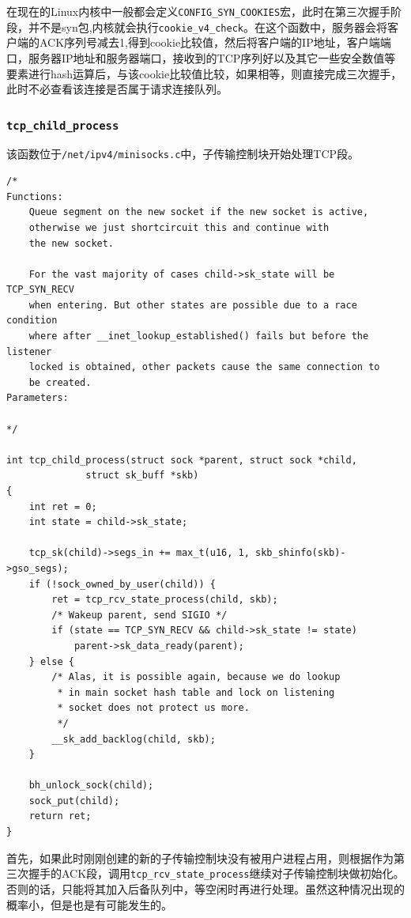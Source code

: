                     在现在的Linux内核中一般都会定义\texttt{CONFIG_SYN_COOKIES}宏，此时在第三次握手阶段，并不是syn包,内核就会执行\texttt{cookie_v4_check}。在这个函数中，服务器会将客户端的ACK序列号减去1,得到cookie比较值，然后将客户端的IP地址，客户端端口，服务器IP地址和服务器端口，接收到的TCP序列好以及其它一些安全数值等要素进行hash运算后，与该cookie比较值比较，如果相等，则直接完成三次握手，此时不必查看该连接是否属于请求连接队列。

                \subsubsection{\texttt{tcp_child_process}}

                    该函数位于\texttt{/net/ipv4/minisocks.c}中，子传输控制块开始处理TCP段。

\begin{verbatim}
/*
Functions:
    Queue segment on the new socket if the new socket is active,
    otherwise we just shortcircuit this and continue with
    the new socket.

    For the vast majority of cases child->sk_state will be TCP_SYN_RECV
    when entering. But other states are possible due to a race condition
    where after __inet_lookup_established() fails but before the listener
    locked is obtained, other packets cause the same connection to
    be created.
Parameters:
    
*/

int tcp_child_process(struct sock *parent, struct sock *child,
              struct sk_buff *skb)
{
    int ret = 0;
    int state = child->sk_state;

    tcp_sk(child)->segs_in += max_t(u16, 1, skb_shinfo(skb)->gso_segs);
    if (!sock_owned_by_user(child)) {
        ret = tcp_rcv_state_process(child, skb);
        /* Wakeup parent, send SIGIO */
        if (state == TCP_SYN_RECV && child->sk_state != state)
            parent->sk_data_ready(parent);
    } else {
        /* Alas, it is possible again, because we do lookup
         * in main socket hash table and lock on listening
         * socket does not protect us more.
         */
        __sk_add_backlog(child, skb);
    }

    bh_unlock_sock(child);
    sock_put(child);
    return ret;
}
\end{verbatim}

                首先，如果此时刚刚创建的新的子传输控制块没有被用户进程占用，则根据作为第三次握手的ACK段，调用\texttt{tcp_rcv_state_process}继续对子传输控制块做初始化。否则的话，只能将其加入后备队列中，等空闲时再进行处理。虽然这种情况出现的概率小，但是也是有可能发生的。

